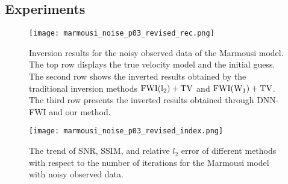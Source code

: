\documentclass[mathserif,envcountsect,compress,8pt]{beamer}
\begin{document}
\subsection{Experiments}
\begin{frame}
	\setlength{\parskip}{0.6\baselineskip}
	\begin{figure}[H]
		\centering
		\texttt{[image: marmousi\_noise\_p03\_revised\_rec.png]}
		\caption{Inversion results for the noisy observed data of the Marmousi model.
			The top row displays the true velocity model and the initial guess.
			The second row shows the inverted results obtained by the traditional inversion methods $\rm{FWI(l_2)+TV}$ and $\rm{FWI(W_1)+TV}$.
			The third row presents the inverted results obtained through DNN-FWI and our method.}
		\label{fig_mar2-1}
	\end{figure}
	
\end{frame}


\begin{frame}
	\setlength{\parskip}{0.6\baselineskip}
	\begin{figure}[H]
		\centering
		\texttt{[image: marmousi\_noise\_p03\_revised\_index.png]}
		\caption{The trend of SNR, SSIM, and relative $l_2$ error of different methods with
			respect to the number of iterations for the Marmousi model with noisy observed data.}
		\label{fig_mar2-4}
	\end{figure}
\end{frame}
\end{document}

